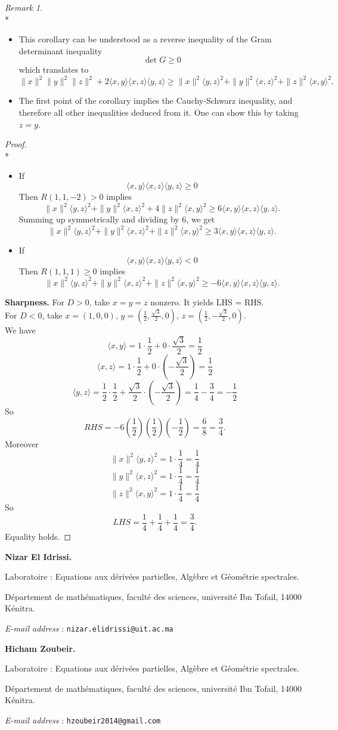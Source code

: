 \documentclass[a4paper,10pt]{article}
\makeatletter
\theoremstyle{plain}
\theoremstyle{definition}
\theoremstyle{remark}
\newtheorem{remark}[theorem]{Remark}
\newcommand{\Addresses}{{%
  \bigskip
  \footnotesize

  \textbf{Nizar El Idrissi.}
  \par\nopagebreak Laboratoire : Equations aux dérivées partielles, Algèbre et Géométrie spectrales.
  \par\nopagebreak
  Département de mathématiques, faculté des sciences, université Ibn Tofail, 14000 Kénitra.\par\nopagebreak 
  \textit{E-mail address} : \texttt{nizar.elidrissi@uit.ac.ma}
  
  \medskip
  
  \textbf{Hicham Zoubeir.}
  \par\nopagebreak Laboratoire : Equations aux dérivées partielles, Algèbre et Géométrie spectrales.
  \par\nopagebreak
  Département de mathématiques, faculté des sciences, université Ibn Tofail, 14000 Kénitra.\par\nopagebreak 
  \textit{E-mail address} : \texttt{hzoubeir2014@gmail.com}

}}
\makeatother
\begin{document}
\begin{remark} \mbox{}\\* 
\begin{itemize}
\item This corollary can be understood as a reverse inequality of the Gram determinant inequality
\[ \det G \geq 0 \]
which translates to
\[ \|x\|^2 \|y\|^2 \|z\|^2 + 2\langle x, y \rangle \langle x, z \rangle \langle y, z \rangle \geq \|x\|^2 \langle y, z \rangle^2 + \|y\|^2 \langle x, z \rangle^2 + \|z\|^2 \langle x, y \rangle^2. 
\]
\item The first point of the corollary implies the Cauchy-Schwarz inequality, and therefore all other inequalities deduced from it. One can show this by taking $z=y$.
\end{itemize}
\end{remark}

\begin{proof} \mbox{}\\*
\begin{itemize}
\item If 
\[ \langle x, y\rangle \langle x, z\rangle \langle y, z\rangle \geq 0 \]
Then $R(1,1,-2) > 0$ implies
\[ \|x\|^2 \langle y, z \rangle^2 + \|y\|^2 \langle x, z \rangle^2 + 4 \|z\|^2 \langle x, y \rangle^2  \geq 6 \langle x, y\rangle \langle x, z\rangle \langle y, z\rangle.\]
Summing up symmetrically and dividing by 6, we get
\[ \|x\|^2 \langle y, z \rangle^2 + \|y\|^2 \langle x, z \rangle^2 + \|z\|^2 \langle x, y \rangle^2  \geq 3 \langle x, y\rangle \langle x, z\rangle \langle y, z\rangle.\]
\item If
\[ \langle x, y\rangle \langle x, z\rangle \langle y, z\rangle < 0 \]
Then $R(1,1,1) \geq 0$ implies
\[ \|x\|^2 \langle y, z \rangle^2 + \|y\|^2 \langle x, z \rangle^2 + \|z\|^2 \langle x, y \rangle^2  \geq - 6 \langle x, y\rangle \langle x, z\rangle \langle y, z\rangle. \]
\end{itemize}
\textbf{Sharpness.} For $D>0$, take \( x = y = z \) nonzero. It yields LHS = RHS. \\
For $D < 0$, take \(x = (1,0,0)\), \(y = \left(\frac12, \frac{\sqrt{3}}{2}, 0\right)\), \(z = \left(\frac12, -\frac{\sqrt{3}}{2}, 0\right)\). \\ 
We have
\[
\langle x, y \rangle = 1\cdot \frac12 + 0\cdot \frac{\sqrt{3}}{2} = \frac12
\]
\[
\langle x, z \rangle = 1\cdot \frac12 + 0\cdot \left(-\frac{\sqrt{3}}{2}\right) = \frac12
\]
\[
\langle y, z \rangle = \frac12\cdot \frac12 + \frac{\sqrt{3}}{2} \cdot \left(-\frac{\sqrt{3}}{2}\right) = \frac14 - \frac{3}{4} = -\frac12
\]
So 
\[ RHS = -6\left(\frac12\right)\left(\frac12\right)\left(-\frac12\right) = \frac68 = \frac34. \]
Moreover
\[
\|x\|^2 \langle y, z\rangle^2 = 1\cdot \frac14 = \frac14
\]
\[
\|y\|^2 \langle x, z\rangle^2 = 1\cdot \frac14 = \frac14
\]
\[
\|z\|^2 \langle x, y\rangle^2 = 1\cdot \frac14 = \frac14
\]
So 
\[ LHS = \frac14 + \frac14 + \frac14  = \frac 34. \]
Equality holds.
\end{proof}

\nocite{*} %



\Addresses
\end{document}

